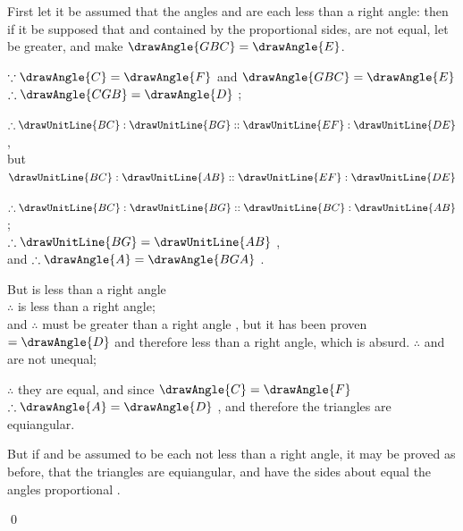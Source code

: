 \documentclass[booklanguage=english]{byrnebook}
\begin{document}
\begin{center}
First let it be assumed that the angles  and  are each less than a right angle: then if it be supposed that  and  contained by the proportional sides, are not equal, let  be greater, and make $\drawAngle{GBC} = \drawAngle{E}$.

$\because \drawAngle{C} = \drawAngle{F}$ \byref{\hypref} and $\drawAngle{GBC} = \drawAngle{E}$ \byref{\constref}\\ %
$\therefore \drawAngle{CGB} = \drawAngle{D}$ ;

$\therefore \drawUnitLine{BC} : \drawUnitLine{BG} :: \drawUnitLine{EF} : \drawUnitLine{DE}$ ,\\
but $\drawUnitLine{BC} : \drawUnitLine{AB} :: \drawUnitLine{EF} : \drawUnitLine{DE}$ \byref{\hypref}

$\therefore \drawUnitLine{BC} : \drawUnitLine{BG} :: \drawUnitLine{BC} : \drawUnitLine{AB}$;\\
$\therefore \drawUnitLine{BG} = \drawUnitLine{AB}$ ,\\
and $\therefore \drawAngle{A} = \drawAngle{BGA}$ .

But  is less than a right angle \byref{\hypref}\\
$\therefore$  is less than a right angle;\\
and $\therefore$  must be greater than a right angle , but it has been proven $= \drawAngle{D}$ and therefore less than a right angle, which is absurd. $\therefore$  and  are not unequal;

$\therefore$ they are equal, and since $\drawAngle{C} = \drawAngle{F}$ \byref{\hypref}\\
$\therefore \drawAngle{A} = \drawAngle{D}$ , and therefore the triangles are equiangular.
\end{center}

But if  and  be assumed to be each not less than a right angle, it may be proved as before, that the triangles are equiangular, and have the sides about equal the angles proportional .

\qed
\end{document}
